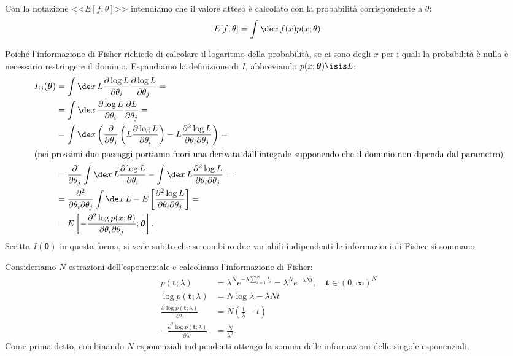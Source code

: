 Con la notazione <<$E[f;\theta]$>> intendiamo che
il valore atteso è calcolato con la probabilità corrispondente a $\theta$:
\begin{equation*}
	E[f;\theta] = \int \de x\, f(x) p(x;\theta).
\end{equation*}

Poiché l'informazione di Fisher richiede di calcolare il logaritmo della probabilità,
se ci sono degli $x$ per i quali la probabilità è nulla
è necessario restringere il dominio.
Espandiamo la definizione di $I$, abbreviando $p(x;\boldsymbol\theta)\isis L$:
\begin{align*}
	I_{ij}(\boldsymbol\theta)
	&= \int\de x\, L
	\frac{\partial\log L}{\partial\theta_i}
	\frac{\partial\log L}{\partial\theta_j} = \\
	&= \int\de x\,
	\frac{\partial\log L}{\partial\theta_i}
	\frac{\partial L}{\partial\theta_j} = \\
	&= \int\de x \left(
	\frac{\partial}{\partial\theta_j} \left( L \frac{\partial\log L}{\partial\theta_i} \right)
	- L \frac{\partial^2\log L}{\partial\theta_i\partial\theta_j} \right) = \\
	\intertext{(nei prossimi due passaggi portiamo fuori una derivata dall'integrale supponendo che il dominio non dipenda dal parametro)}
	&= \frac{\partial}{\partial\theta_j} \int\de x\, L \frac{\partial\log L}{\partial\theta_i}
	- \int\de x\, L \frac{\partial^2\log L}{\partial\theta_i\partial\theta_j} = \\
	&= \frac{\partial^2}{\partial\theta_i\partial\theta_j} \int\de x\, L
	- E \left[ \frac{\partial^2\log L}{\partial\theta_i\partial\theta_j} \right] = \\
	&= E \left[ -\frac{\partial^2\log p(x;\boldsymbol\theta)}{\partial\theta_i\partial\theta_j};\boldsymbol\theta \right].
\end{align*}
Scritta $I(\boldsymbol\theta)$ in questa forma,
si vede subito che se combino due variabili indipendenti le informazioni di Fisher si sommano.

\begin{example}
	Consideriamo $N$ estrazioni dell'esponenziale e calcoliamo l'informazione di Fisher:
	\begin{align*}
		p(\mathbf t;\lambda)
		&= \lambda^N e^{-\lambda\sum_{i=1}^N t_i}
		= \lambda^N e^{-\lambda N \bar t}, \quad \mathbf t\in(0,\infty)^N \\
		\log p(\mathbf t;\lambda)
		&= N\log\lambda - \lambda N\bar t \\
		\frac{\partial \log p(\mathbf t;\lambda)}{\partial\lambda}
		&= N \left( \frac1\lambda - \bar t \right) \\
		-\frac{\partial^2 \log p(\mathbf t;\lambda)}{\partial\lambda^2}
		&= \frac N{\lambda^2}.
	\end{align*}
	Come prima detto, combinando $N$ esponenziali indipendenti ottengo la somma delle informazioni delle singole esponenziali.
\end{example}

